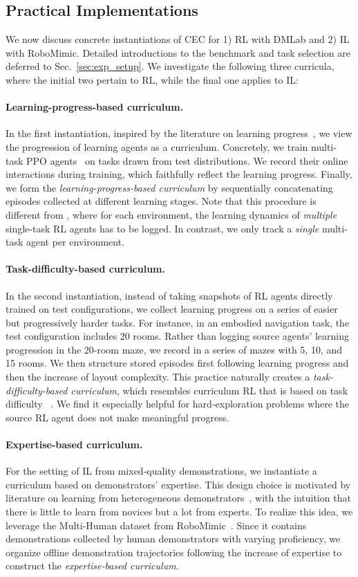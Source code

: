 \documentclass{article}
\newcommand{\para}[1]{\paragraph{#1}\looseness=-1}
\newcommand{\cec}[0]{\mbox{CEC}\xspace}
\begin{document}
\subsection{Practical Implementations}
We now discuss concrete instantiations of \cec for 1) RL with DMLab and 2) IL with RoboMimic.
Detailed introductions to the benchmark and task selection are deferred to Sec.~\ref{sec:exp_setup}.
We investigate the following three curricula, where the initial two pertain to RL, while the final one applies to IL:
\para{Learning-progress-based curriculum.}
In the first instantiation, inspired by the literature on learning progress~\citep{matiisen2017teacherstudent,graves2017automated,portelas2019teacher,kanitscheider2021multitask}, we view the progression of learning agents as a curriculum.
Concretely, we train multi-task PPO agents~\citep{schulman2017proximal,petrenko2020sample} on tasks drawn from test distributions.
We record their online interactions during training, which faithfully reflect the learning progress.
Finally, we form the \textit{learning-progress-based curriculum} by sequentially concatenating episodes collected at different learning stages.
Note that this procedure is different from \citet{laskin2023incontext}, where for each environment, the learning dynamics of \emph{multiple} single-task RL agents has to be logged. In contrast, we only track a \emph{single} multi-task agent per environment.

\para{Task-difficulty-based curriculum.} In the second instantiation, instead of taking snapshots of RL agents directly trained on test configurations, we collect learning progress on a series of easier but progressively harder tasks. For instance, in an embodied navigation task, the test configuration includes 20 rooms. Rather than logging source agents' learning progression in the 20-room maze, we record in a series of mazes with 5, 10, and 15 rooms. We then structure stored episodes first following learning progress and then the increase of layout complexity. This practice naturally creates a \textit{task-difficulty-based curriculum}, which resembles curriculum RL that is based on task difficulty ~\citep{matiisen2017teacherstudent,Narvekar2017AutonomousTS}.
We find it especially helpful for hard-exploration problems where the source RL agent does not make meaningful progress.
\para{Expertise-based curriculum.} For the setting of IL from mixed-quality demonstrations, we instantiate a curriculum based on demonstrators' expertise. This design choice is motivated by literature on learning from heterogeneous demonstrators~\citep{beliaev2022imitation, NEURIPS2021_670e8a43}, with the intuition that there is little to learn from novices but a lot from experts. To realize this idea, we leverage the Multi-Human dataset from RoboMimic~\citep{mandlekar2021matters}. Since it contains demonstrations collected by human demonstrators with varying proficiency, we organize offline demonstration trajectories following the increase of expertise to construct the \textit{expertise-based curriculum}.
\end{document}
